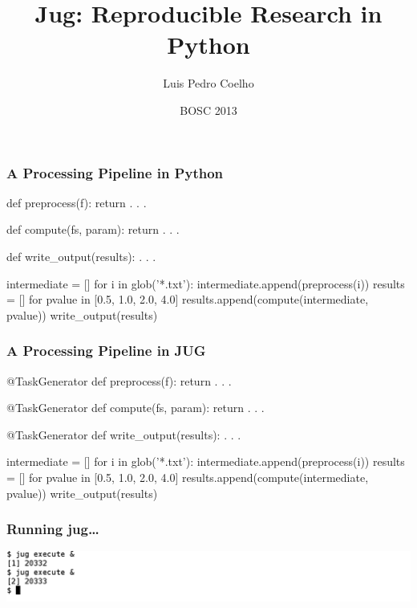 \documentclass{beamer}
\title[Jug]{Jug: Reproducible Research in Python}
\author[luis@luispedro.org]{Luis Pedro Coelho}
\institute{EMBL}
\date{BOSC 2013}
\begin{document}
\frame{\titlepage}

\begin{frame}[fragile]
\frametitle{A Processing Pipeline in Python}

\begin{python}

def preprocess(f):
    return . . .


def compute(fs, param):
    return . . .


def write_output(results):
    . . .

intermediate = []
for i in glob('*.txt'):
    intermediate.append(preprocess(i))
results = []
for pvalue in [0.5, 1.0, 2.0, 4.0]
    results.append(compute(intermediate, pvalue))
write_output(results)
\end{python}
\end{frame}

\begin{frame}[fragile]
\frametitle{A Processing Pipeline in \alert{JUG}}

\begin{python}
@TaskGenerator
def preprocess(f):
    return . . .

@TaskGenerator
def compute(fs, param):
    return . . .

@TaskGenerator
def write_output(results):
    . . .

intermediate = []
for i in glob('*.txt'):
    intermediate.append(preprocess(i))
results = []
for pvalue in [0.5, 1.0, 2.0, 4.0]
    results.append(compute(intermediate, pvalue))
write_output(results)
\end{python}
\end{frame}

\begin{frame}[fragile]
\frametitle{Running jug\ldots}

\centering
\includegraphics[width=.8\textwidth]{jug_execute}

\end{frame}
\end{document}
